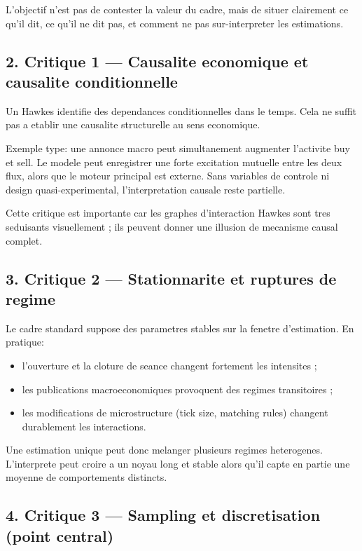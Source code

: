 \documentclass[11pt,a4paper]{article}
\begin{document}
L'objectif n'est pas de contester la valeur du cadre, mais de situer clairement ce qu'il dit, ce qu'il ne dit pas, et comment ne pas sur-interpreter les estimations.

\subsection*{2. Critique 1 --- Causalite economique et causalite conditionnelle}

Un Hawkes identifie des dependances conditionnelles dans le temps. Cela ne suffit pas a etablir une causalite structurelle au sens economique.

Exemple type: une annonce macro peut simultanement augmenter l'activite buy et sell. Le modele peut enregistrer une forte excitation mutuelle entre les deux flux, alors que le moteur principal est externe. Sans variables de controle ni design quasi-experimental, l'interpretation causale reste partielle.

Cette critique est importante car les graphes d'interaction Hawkes sont tres seduisants visuellement ; ils peuvent donner une illusion de mecanisme causal complet.

\subsection*{3. Critique 2 --- Stationnarite et ruptures de regime}

Le cadre standard suppose des parametres stables sur la fenetre d'estimation. En pratique:
\begin{itemize}[leftmargin=1.2cm]
    \item l'ouverture et la cloture de seance changent fortement les intensites ;
    \item les publications macroeconomiques provoquent des regimes transitoires ;
    \item les modifications de microstructure (tick size, matching rules) changent durablement les interactions.
\end{itemize}

Une estimation unique peut donc melanger plusieurs regimes heterogenes. L'interprete peut croire a un noyau long et stable alors qu'il capte en partie une moyenne de comportements distincts.

\subsection*{4. Critique 3 --- Sampling et discretisation (point central)}
\end{document}
